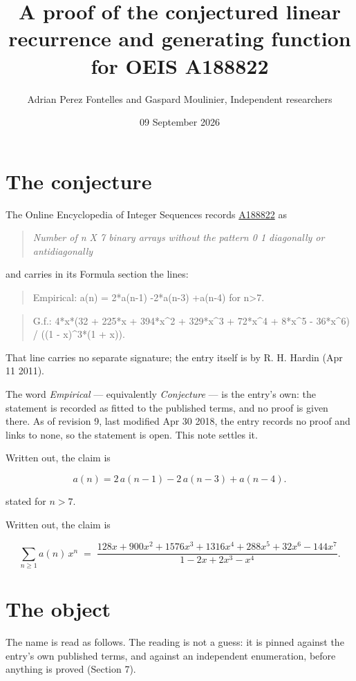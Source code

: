 \documentclass[11pt]{article}
\title{A proof of the conjectured linear recurrence and generating function for OEIS A188822}
\author{Adrian Perez Fontelles and Gaspard Moulinier, Independent researchers}
\date{09 September 2026}
\theoremstyle{definition}
\begin{document}
\maketitle
\section{The conjecture}

The Online Encyclopedia of Integer Sequences records \href{https://oeis.org/A188822}{A188822} as

\begin{quote}\itshape Number of n X 7 binary arrays without the pattern 0 1 diagonally or antidiagonally\end{quote}

and carries in its Formula section the lines:

\begin{quote}\ttfamily Empirical: a(n) = 2*a(n-1) -2*a(n-3) +a(n-4) for n>7.\end{quote}

\begin{quote}\ttfamily G.f.: 4*x*(32 + 225*x + 394*x\textasciicircum{}2 + 329*x\textasciicircum{}3 + 72*x\textasciicircum{}4 + 8*x\textasciicircum{}5 - 36*x\textasciicircum{}6) / ((1 - x)\textasciicircum{}3*(1 + x)).\end{quote}

That line carries no separate signature; the entry itself is by R. H. Hardin (Apr 11 2011).

The word {\itshape Empirical} --- equivalently {\itshape Conjecture} --- is the entry's own: the statement is recorded as fitted to the published terms, and no proof is given there. As of revision 9, last modified Apr 30 2018, the entry records no proof and links to none, so the statement is open. This note settles it.

Written out, the claim is

\[a(n) = 2\,a(n-1) - 2\,a(n-3) + a(n-4).\]

stated for $n > 7$.

Written out, the claim is

\[\sum_{n \ge 1} a(n)\,x^n \;=\; \frac{128x + 900x^{2} + 1576x^{3} + 1316x^{4} + 288x^{5} + 32x^{6} - 144x^{7}}{1 - 2x + 2x^{3} - x^{4}}.\]

\section{The object}

The name is read as follows. The reading is not a guess: it is pinned against the entry's own published terms, and against an independent enumeration, before anything is proved (Section 7).
\end{document}
